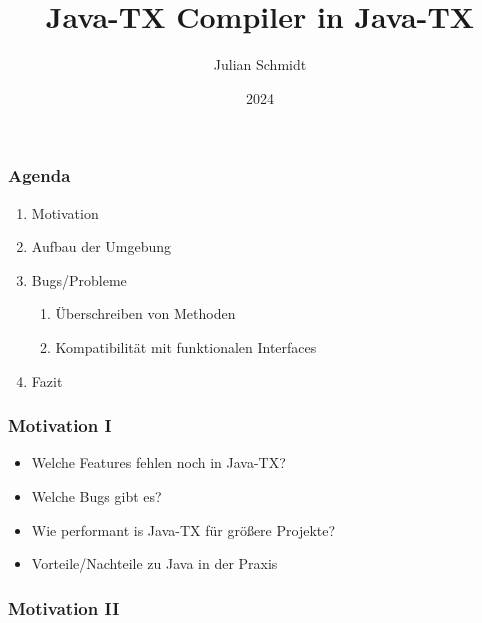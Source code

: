 \documentclass{beamer}
\title{Java-TX Compiler in Java-TX}
\author{Julian Schmidt}
\institute{DHBW Stuttgart}
\date{2024}
\begin{document}
\maketitle

\begin{frame}
    \frametitle{Agenda}
    \begin{enumerate}
        \item Motivation
        \item Aufbau der Umgebung
        \item Bugs/Probleme
              \begin{enumerate}
                  \item Überschreiben von Methoden
                  \item Kompatibilität mit funktionalen Interfaces
              \end{enumerate}
        \vspace*{-\baselineskip}
        \item Fazit

    \end{enumerate}
\end{frame}

\begin{frame}
    \frametitle{Motivation I}

    \begin{itemize}
        \item Welche Features fehlen noch in Java-TX?
        \item Welche Bugs gibt es?
        \item Wie performant is Java-TX für größere Projekte?
        \item Vorteile/Nachteile zu Java in der Praxis
    \end{itemize}

\end{frame}

\begin{frame}
    \frametitle{Motivation II}
    \begin{center}
    \end{center}
\end{frame}
\end{document}
